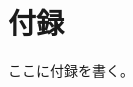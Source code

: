 \documentclass[12pt,a4paper,oneside,onecolumn,fleqn,dvipdfmx]{jreport}
\begin{document}
    \chapter*{付録}
        ここに付録を書く。
\end{document}
